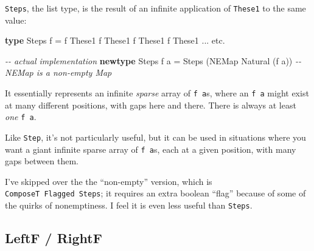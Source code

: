 \documentclass[]{article}
\newenvironment{Shaded}{}{}
\newcommand{\CommentTok}[1]{\textcolor[rgb]{0.38,0.63,0.69}{\textit{#1}}}
\newcommand{\DataTypeTok}[1]{\textcolor[rgb]{0.56,0.13,0.00}{#1}}
\newcommand{\KeywordTok}[1]{\textcolor[rgb]{0.00,0.44,0.13}{\textbf{#1}}}
\newcommand{\NormalTok}[1]{#1}
\newcommand{\OperatorTok}[1]{\textcolor[rgb]{0.40,0.40,0.40}{#1}}
\newcommand{\OtherTok}[1]{\textcolor[rgb]{0.00,0.44,0.13}{#1}}
\begin{document}
\begin{itemize}
  \texttt{Steps}, the list type, is the result of an infinite application of
  \texttt{These1} to the same value:

\begin{Shaded}
\begin{Highlighting}[]
\KeywordTok{type} \DataTypeTok{Steps}\NormalTok{ f }\OtherTok{=}\NormalTok{ f }\OtherTok{\textasciigrave{}These1\textasciigrave{}}\NormalTok{ f }\OtherTok{\textasciigrave{}These1\textasciigrave{}}\NormalTok{ f }\OtherTok{\textasciigrave{}These1\textasciigrave{}}\NormalTok{ f }\OtherTok{\textasciigrave{}These1\textasciigrave{}} \OperatorTok{...}\NormalTok{ etc}\OperatorTok{.}

\CommentTok{{-}{-} actual implementation}
\KeywordTok{newtype} \DataTypeTok{Steps}\NormalTok{ f a }\OtherTok{=} \DataTypeTok{Steps}\NormalTok{ (}\DataTypeTok{NEMap} \DataTypeTok{Natural}\NormalTok{ (f a))}
                \CommentTok{{-}{-} NEMap is a non{-}empty Map}
\end{Highlighting}
\end{Shaded}

  It essentially represents an infinite \emph{sparse} array of \texttt{f\ a}s,
  where an \texttt{f\ a} might exist at many different positions, with gaps here
  and there. There is always at least \emph{one} \texttt{f\ a}.

  Like \texttt{Step}, it's not particularly useful, but it can be used in
  situations where you want a giant infinite sparse array of \texttt{f\ a}s,
  each at a given position, with many gaps between them.

  I've skipped over the the ``non-empty'' version, which is
  \texttt{ComposeT\ Flagged\ Steps}; it requires an extra boolean ``flag''
  because of some of the quirks of nonemptiness. I feel it is even less useful
  than \texttt{Steps}.
\end{itemize}

\hypertarget{leftf-rightf}{%
\subsection{LeftF / RightF}\label{leftf-rightf}}
\end{document}
